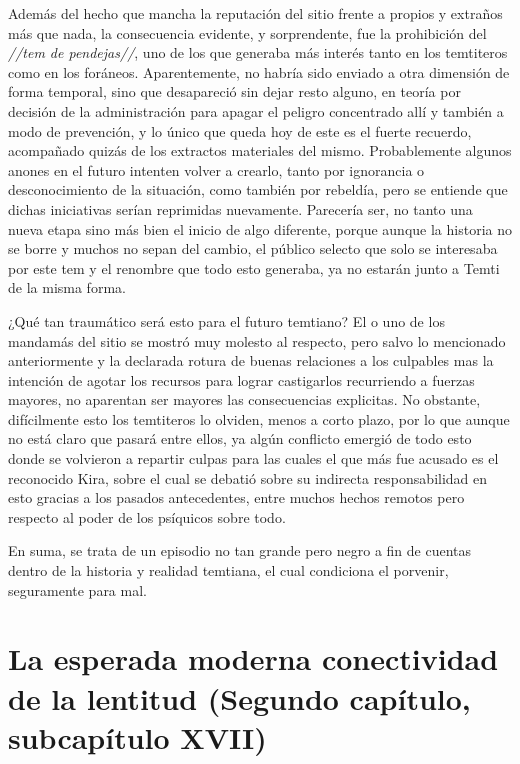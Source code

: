 \documentclass[
  spanish,
]{book}
\begin{document}
Además del hecho que mancha la reputación del sitio frente a propios y extraños más que nada, la consecuencia evidente, y sorprendente, fue la prohibición del \emph{//tem de pendejas//}, uno de los que generaba más interés tanto en los temtiteros como en los foráneos.
Aparentemente, no habría sido enviado a otra dimensión de forma temporal, sino que desapareció sin dejar resto alguno, en teoría por decisión de la administración para apagar el peligro concentrado allí y también a modo de prevención, y lo único que queda hoy de este es el fuerte recuerdo, acompañado quizás de los extractos materiales del mismo.
Probablemente algunos anones en el futuro intenten volver a crearlo, tanto por ignorancia o desconocimiento de la situación, como también por rebeldía, pero se entiende que dichas iniciativas serían reprimidas nuevamente. Parecería ser, no tanto una nueva etapa sino más bien el inicio de algo diferente, porque aunque la historia no se borre y muchos no sepan del cambio, el público selecto que solo se interesaba por este tem y el renombre que todo esto generaba, ya no estarán junto a Temti de la misma forma.

¿Qué tan traumático será esto para el futuro temtiano?
El o uno de los mandamás del sitio se mostró muy molesto al respecto, pero salvo lo mencionado anteriormente y la declarada rotura de buenas relaciones a los culpables mas la intención de agotar los recursos para lograr castigarlos recurriendo a fuerzas mayores, no aparentan ser mayores las consecuencias explicitas. No obstante, difícilmente esto los temtiteros lo olviden, menos a corto plazo, por lo que aunque no está claro que pasará entre ellos, ya algún conflicto emergió de todo esto donde se volvieron a repartir culpas para las cuales el que más fue acusado es el reconocido Kira, sobre el cual se debatió sobre su indirecta responsabilidad en esto gracias a los pasados antecedentes, entre muchos hechos remotos pero respecto al poder de los psíquicos sobre todo.

En suma, se trata de un episodio no tan grande pero negro a fin de cuentas dentro de la historia y realidad temtiana, el cual condiciona el porvenir, seguramente para mal.

\hypertarget{la-esperada-moderna-conectividad-de-la-lentitud-segundo-capuxedtulo-subcapuxedtulo-xvii}{%
\section{La esperada moderna conectividad de la lentitud (Segundo capítulo, subcapítulo XVII)}\label{la-esperada-moderna-conectividad-de-la-lentitud-segundo-capuxedtulo-subcapuxedtulo-xvii}}
\end{document}
